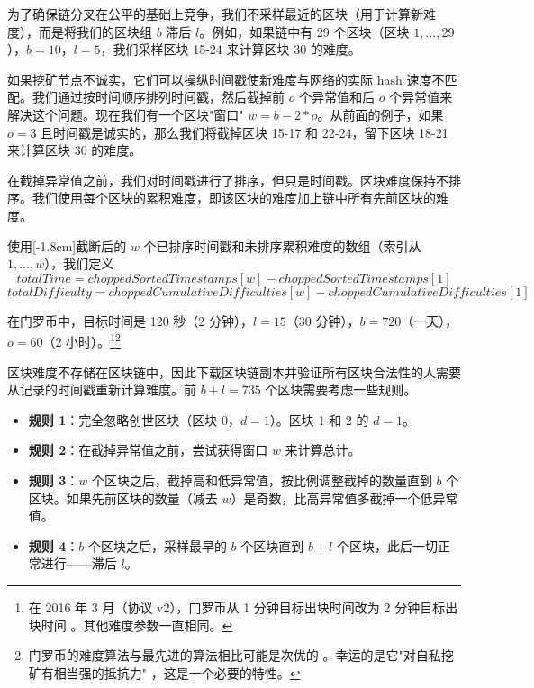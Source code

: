 为了确保链分叉在公平的基础上竞争，我们不采样最近的区块（用于计算新难度），而是将我们的区块组 $b$ 滞后 $l$。例如，如果链中有 29 个区块（区块 $1,...,29$），$b = 10$，$l = 5$，我们采样区块 15-24 来计算区块 30 的难度。

如果挖矿节点不诚实，它们可以操纵时间戳使新难度与网络的实际 hash 速度不匹配。我们通过按时间顺序排列时间戳，然后截掉前 $o$ 个异常值和后 $o$ 个异常值来解决这个问题。现在我们有一个区块"窗口" $w = b-2*o$。从前面的例子，如果 $o = 3$ 且时间戳是诚实的，那么我们将截掉区块 15-17 和 22-24，留下区块 18-21 来计算区块 30 的难度。

在截掉异常值之前，我们对时间戳进行了排序，但{只}是时间戳。区块难度保持不排序。我们使用每个区块的累积难度，即该区块的难度加上链中所有先前区块的难度。

使用[-1.8cm]截断后的 $w$ 个已排序时间戳和未排序累积难度的数组（索引从 $1,...,w$），我们定义
\[ \mathit{totalTime} = \mathit{choppedSortedTimestamps}[w] - \mathit{choppedSortedTimestamps}[1]\]
\[ \mathit{totalDifficulty} = \mathit{choppedCumulativeDifficulties}[w] - \mathit{choppedCumulativeDifficulties}[1]\]

在门罗币中，目标时间是 120 秒（2 分钟），$l = 15$（30 分钟），$b = 720$（一天），$o = 60$（2 小时）。\footnote{在 2016 年 3 月（协议 v2），门罗币从 1 分钟目标出块时间改为 2 分钟目标出块时间 \cite{monero-0.9.3}。其他难度参数一直相同。}\footnote{门罗币的难度算法与最先进的算法相比可能是次优的 \cite{difficuly-algorithm-summary}。幸运的是它"对自私挖矿有相当强的抵抗力" \cite{selfish-miner-profitability-algorithm-analysis}，这是一个必要的特性。}

区块难度不存储在区块链中，因此下载区块链副本并验证所有区块合法性的人需要从记录的时间戳重新计算难度。前 $b+l = 735$ 个区块需要考虑一些规则。

\begin{itemize}
    \item[] \textbf{规则 1}：完全忽略创世区块（区块 0，$d = 1$）。区块 1 和 2 的 $d = 1$。
    \item[] \textbf{规则 2}：在截掉异常值之前，尝试获得窗口 $w$ 来计算总计。
    \item[] \textbf{规则 3}：$w$ 个区块之后，截掉高和低异常值，按比例调整截掉的数量直到 $b$ 个区块。如果先前区块的数量（减去 $w$）是奇数，比高异常值多截掉一个低异常值。
    \item[] \textbf{规则 4}：$b$ 个区块之后，采样最早的 $b$ 个区块直到 $b+l$ 个区块，此后一切正常进行——滞后 $l$。
\end{itemize}


